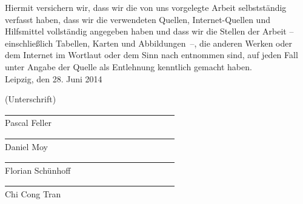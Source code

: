 \newpage
\pagestyle{empty}


\text{ }
\vspace{13.5cm}




Hiermit versichern wir, dass wir die von uns vorgelegte Arbeit selbstständig verfasst haben, dass wir die verwendeten Quellen, Internet-Quellen und Hilfsmittel vollständig angegeben haben und dass wir die Stellen der Arbeit -- einschließlich Tabellen, Karten und Abbildungen~--, die anderen Werken oder dem Internet im Wortlaut oder dem Sinn nach entnommen sind, auf jeden Fall unter Angabe der Quelle als Entlehnung kenntlich gemacht haben.\\

Leipzig, den 28. Juni 2014\\
\medskip
\medskip

(Unterschrift)\\
\underline{~~~~~~~~~~~~~~~~~~~~~~~~~~~~~~~~~~~~~~~~}\\
Pascal Feller\\
\underline{~~~~~~~~~~~~~~~~~~~~~~~~~~~~~~~~~~~~~~~~}\\
Daniel Moy\\
\underline{~~~~~~~~~~~~~~~~~~~~~~~~~~~~~~~~~~~~~~~~}\\
Florian Schünhoff\\
\underline{~~~~~~~~~~~~~~~~~~~~~~~~~~~~~~~~~~~~~~~~}\\
Chi Cong Tran\\

\newpage

